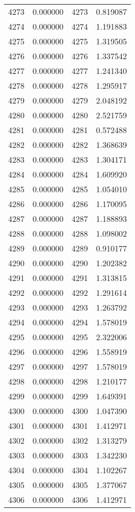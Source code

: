 \documentclass[12pt]{article}
\begin{document}
\begin{longtable}{@{}cccc@{}}
4273 & 0.000000 & 4273 & 0.819087 \\
4274 & 0.000000 & 4274 & 1.191883 \\
4275 & 0.000000 & 4275 & 1.319505 \\
4276 & 0.000000 & 4276 & 1.337542 \\
4277 & 0.000000 & 4277 & 1.241340 \\
4278 & 0.000000 & 4278 & 1.295917 \\
4279 & 0.000000 & 4279 & 2.048192 \\
4280 & 0.000000 & 4280 & 2.521759 \\
4281 & 0.000000 & 4281 & 0.572488 \\
4282 & 0.000000 & 4282 & 1.368639 \\
4283 & 0.000000 & 4283 & 1.304171 \\
4284 & 0.000000 & 4284 & 1.609920 \\
4285 & 0.000000 & 4285 & 1.054010 \\
4286 & 0.000000 & 4286 & 1.170095 \\
4287 & 0.000000 & 4287 & 1.188893 \\
4288 & 0.000000 & 4288 & 1.098002 \\
4289 & 0.000000 & 4289 & 0.910177 \\
4290 & 0.000000 & 4290 & 1.202382 \\
4291 & 0.000000 & 4291 & 1.313815 \\
4292 & 0.000000 & 4292 & 1.291614 \\
4293 & 0.000000 & 4293 & 1.263792 \\
4294 & 0.000000 & 4294 & 1.578019 \\
4295 & 0.000000 & 4295 & 2.322006 \\
4296 & 0.000000 & 4296 & 1.558919 \\
4297 & 0.000000 & 4297 & 1.578019 \\
4298 & 0.000000 & 4298 & 1.210177 \\
4299 & 0.000000 & 4299 & 1.649391 \\
4300 & 0.000000 & 4300 & 1.047390 \\
4301 & 0.000000 & 4301 & 1.412971 \\
4302 & 0.000000 & 4302 & 1.313279 \\
4303 & 0.000000 & 4303 & 1.342230 \\
4304 & 0.000000 & 4304 & 1.102267 \\
4305 & 0.000000 & 4305 & 1.377067 \\
4306 & 0.000000 & 4306 & 1.412971 \\

\end{longtable}
\end{document}
